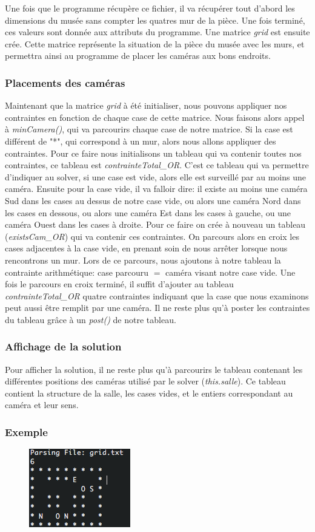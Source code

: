 \documentclass[a4paper,10pt]{article}
\begin{document}
			Une fois que le programme récupère ce fichier, il va récupérer tout d'abord les dimensions du musée sans compter les quatres mur de la pièce.  Une fois terminé, ces valeurs sont donnée aux attributs du programme. Une matrice \emph{grid} est ensuite crée.  Cette matrice représente la situation de la pièce du musée avec les murs, et permettra ainsi au programme de placer les caméras aux bons endroits.

		\subsubsection{Placements des caméras}
			Maintenant que la matrice \emph{grid} à été initialiser, nous pouvons appliquer nos contraintes en fonction de chaque case de cette matrice. Nous faisons alors appel à \emph{minCamera()}, qui va parcourirs chaque case de notre matrice.  Si la case est différent de "*", qui correspond à un mur, alors nous allons appliquer des contraintes. Pour ce faire nous initialisons un tableau qui va contenir toutes nos contraintes, ce tableau est \emph{contrainteTotal\_OR}. C'est ce tableau qui va permettre d'indiquer au solver, si une case est vide, alors elle est surveillé par au moins une caméra. Ensuite pour la case vide, il va falloir dire: il existe au moins une caméra Sud dans les cases au dessus de notre case vide, ou alors une caméra Nord dans les cases en dessous, ou alors une caméra Est dans les cases à gauche, ou une caméra Ouest dans les cases à droite.  Pour ce faire on crée à nouveau un tableau (\emph{existsCam\_OR}) qui va contenir ces contraintes. On parcours alors en croix les cases adjacentes à la case vide, en prenant soin de nous arrêter lorsque nous rencontrons un mur. Lors de ce parcours, nous ajoutons à notre tableau la contrainte arithmétique: case parcouru $=$ caméra visant notre case vide. Une fois le parcours en croix terminé, il suffit d'ajouter au tableau \emph{contrainteTotal\_OR} quatre contraintes indiquant que la case que nous examinons peut aussi être remplit par une caméra. Il ne reste plus qu'à poster les contraintes du tableau grâce à un \emph{post()} de notre tableau.

		\subsubsection{Affichage de la solution}
			Pour afficher la solution, il ne reste plus qu'à parcourirs le tableau contenant les différentes positions des caméras utilisé par le solver (\emph{this.salle}).  Ce tableau contient la structure de la salle, les cases vides, et le entiers correspondant au caméra et leur sens.

		\subsubsection{Exemple}
			\begin{figure}[h]
			\begin{center}
				\includegraphics[scale=0.7]{figs/sol.png}
			\end{center}
			\end{figure}
\end{document}
